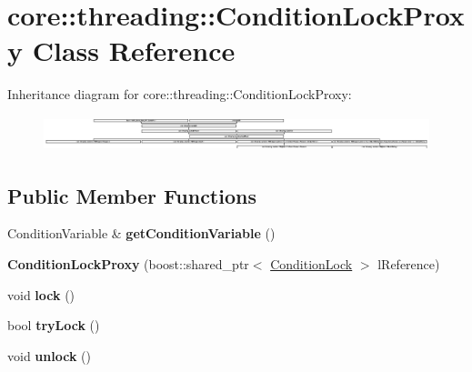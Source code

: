 \hypertarget{classcore_1_1threading_1_1_condition_lock_proxy}{\section{core\-:\-:threading\-:\-:Condition\-Lock\-Proxy Class Reference}
\label{classcore_1_1threading_1_1_condition_lock_proxy}
}
Inheritance diagram for core\-:\-:threading\-:\-:Condition\-Lock\-Proxy\-:\begin{figure}[H]
\begin{center}
\leavevmode
\includegraphics[height=1.025641cm]{classcore_1_1threading_1_1_condition_lock_proxy}
\end{center}
\end{figure}
\subsection*{Public Member Functions}
\begin{DoxyCompactItemize}
\item 
\hypertarget{classcore_1_1threading_1_1_condition_lock_proxy_a5dd726b5def9b5a3f1bc9c368260754b}{Condition\-Variable \& {\bfseries get\-Condition\-Variable} ()}\label{classcore_1_1threading_1_1_condition_lock_proxy_a5dd726b5def9b5a3f1bc9c368260754b}

\item 
\hypertarget{classcore_1_1threading_1_1_condition_lock_proxy_ac83e5f9bc8cfa594449d2a6b5184afb2}{{\bfseries Condition\-Lock\-Proxy} (boost\-::shared\-\_\-ptr$<$ \hyperlink{classcore_1_1threading_1_1_condition_lock}{Condition\-Lock} $>$ l\-Reference)}\label{classcore_1_1threading_1_1_condition_lock_proxy_ac83e5f9bc8cfa594449d2a6b5184afb2}

\item 
\hypertarget{classcore_1_1threading_1_1_condition_lock_proxy_a87a45f2c503fdb98136a59bc89784e42}{void {\bfseries lock} ()}\label{classcore_1_1threading_1_1_condition_lock_proxy_a87a45f2c503fdb98136a59bc89784e42}

\item 
\hypertarget{classcore_1_1threading_1_1_condition_lock_proxy_acbb76b3ab113f4ca5a86f0eb98ceef3d}{bool {\bfseries try\-Lock} ()}\label{classcore_1_1threading_1_1_condition_lock_proxy_acbb76b3ab113f4ca5a86f0eb98ceef3d}

\item 
\hypertarget{classcore_1_1threading_1_1_condition_lock_proxy_a6aaee7713befe60e2f8821ff54856dd7}{void {\bfseries unlock} ()}\label{classcore_1_1threading_1_1_condition_lock_proxy_a6aaee7713befe60e2f8821ff54856dd7}

\end{DoxyCompactItemize}

